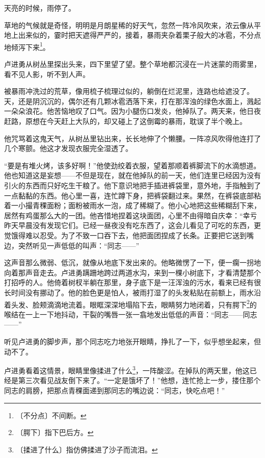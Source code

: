 \documentclass[12pt,UTF-8,openany]{ctexbook}
\begin{document}
\begin{normalsize}
    
    天亮的时候，雨停了。
    
    草地的气候就是奇怪，明明是月朗星稀的好天气，忽然一阵冷风吹来，浓云像从平地上出来似的，霎时把天遮得严严的，接着，暴雨夹杂着栗子般大的冰雹，不分点地倾泻下来\footnote{〔不分点〕不间断。}。
    
    卢进勇从树丛里探出头来，四下里望了望。整个草地都沉浸在一片迷蒙的雨雾里，看不见人影，听不到人声。
    
    被暴雨冲洗过的荒草，像用梳子梳理过似的，躺倒在烂泥里，连路也给遮没了。天，还是阴沉沉的，偶尔还有几颗冰雹洒落下来，打在那浑浊的绿色水面上，溅起一朵朵浪花。他苦恼地叹了口气。因为小腿伤口发炎，他掉队了。两天来，他日夜赶路，原想在今天赶上大队的，却又碰上了这倒霉的暴雨，耽误了半个晚上。
    
    他咒骂着这鬼天气，从树丛里钻出来，长长地伸了个懒腰。一阵凉风吹得他连打了几个寒颤。他这才发现衣服完全湿透了。
    
    “要是有堆火烤，该多好啊！”他使劲绞着衣服，望着那顺着裤脚流下的水滴想道。他也知道这是妄想——不但是现在，就在他掉队的前一天，他们连里已经因为没有引火的东西而只好吃生干粮了。他下意识地把手插进裤袋里，意外地，手指触到了一点黏黏的东西。他心里一喜，连忙蹲下身，把裤袋翻过来。果然，在裤袋底部粘着一小撮青稞面粉；面粉被雨水一泡，成了稀糊了。他小心地把这些稀糊刮下来，居然有鸡蛋那么大的一团。他吝惜地捏着这块面团，心里不由得暗自庆幸：“幸亏昨天早晨没有发现它们。已经一昼夜没有吃东西了，这会儿看见了可吃的东西，更觉饿得难以忍受。为了不致一口吞下去，他把面团捏成了长条。正要把它送到嘴边，突然听见一声低低的叫声：“同志——”
    
    这声音那么微弱、低沉，就像从地底下发出来的。他略微愣了一下，便一瘸一拐地向着那声音走去。卢进勇蹒跚地跨过两道水沟，来到一棵小树底下，才看清楚那个打招呼的人。他倚着树杈半躺在那里，身子底下是一汪浑浊的污水，看来已经有很长时间没有挪动了。他的脸色更是怕人，被雨打湿了的头发粘贴在前额上，雨水沿着头发、脸颊滴滴地流着。眼眶深深地塌陷下去，眼睛努力地闭着，只有腭下\footnote{〔腭下〕指下巴后方。}的喉结在一上一下地抖动，干裂的嘴唇一张一翕地发出低低的声音：“同志——同志——”
    
    听见卢进勇的脚步声，那个同志吃力地张开眼睛，挣扎了一下，似乎想坐起来，但动不了。
    
    卢进勇看着这情景，眼睛里像揉进了什么\footnote{〔揉进了什么〕指仿佛揉进了沙子而流泪。}，一阵酸涩。在掉队的两天里，他这已经是第三次看见战友倒下来了。“一定是饿坏了！”他想，连忙抢上一步，搂住那个同志的肩膀，把那点青稞面递到那同志的嘴边说：“同志，快吃点吧！”
    

\end{normalsize}
\end{document}
